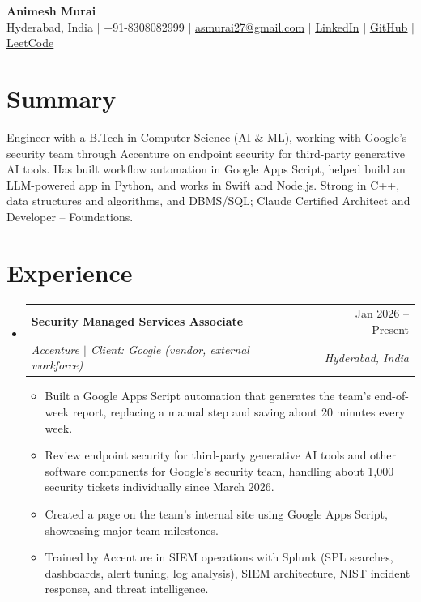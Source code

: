 \documentclass[a4paper,11pt]{article}
\makeatletter
\newcommand{\resumeItem}[1]{\item\small{#1\vspace{-1pt}}}
\newcommand{\resumeSubheading}[4]{
  \vspace{-1pt}\item
    \begin{tabularx}{0.97\textwidth}[t]{@{}>{\raggedright\arraybackslash}X@{\hspace{0.75em}}r@{}}
      \textbf{#1} & #2 \\
      \textit{\small#3} & \textit{\small #4} \\
    \end{tabularx}\vspace{-3pt}
}
\newcommand{\resumeSubItemListStart}{\begin{itemize}[leftmargin=0.15in, label={}]}
\newcommand{\resumeSubItemListEnd}{\end{itemize}}
\newcommand{\resumeItemListStart}{\begin{itemize}[itemsep=2pt]}
\newcommand{\resumeItemListEnd}{\end{itemize}\vspace{-2pt}}
\makeatother
\begin{document}
\begin{center}
    {\Huge\bfseries Animesh Murai} \\ \vspace{4pt}
    \small Hyderabad, India $|$ +91-8308082999 $|$
    \href{mailto:asmurai27@gmail.com}{\underline{asmurai27@gmail.com}} $|$
    \href{https://www.linkedin.com/in/animesh-murai-538384253/}{\underline{LinkedIn}} $|$
    \href{https://github.com/muraias7781}{\underline{GitHub}} $|$
    \href{https://leetcode.com/u/sAMurai7781/}{\underline{LeetCode}}
\end{center}

\section{Summary}
  \small{Engineer with a B.Tech in Computer Science (AI \& ML), working with Google's security team through Accenture on endpoint security for third-party generative AI tools. Has built workflow automation in Google Apps Script, helped build an LLM-powered app in Python, and works in Swift and Node.js. Strong in C++, data structures and algorithms, and DBMS/SQL; Claude Certified Architect and Developer -- Foundations.}

\section{Experience}
  \resumeSubItemListStart

    \resumeSubheading
      {Security Managed Services Associate}{Jan 2026 -- Present}
      {Accenture $|$ Client: Google (vendor, external workforce)}{Hyderabad, India}
      \resumeItemListStart
        \resumeItem{Built a Google Apps Script automation that generates the team's end-of-week report, replacing a manual step and saving about 20 minutes every week.}
        \resumeItem{Review endpoint security for third-party generative AI tools and other software components for Google's security team, handling about 1,000 security tickets individually since March 2026.}
        \resumeItem{Created a page on the team's internal site using Google Apps Script, showcasing major team milestones.}
        \resumeItem{Trained by Accenture in SIEM operations with Splunk (SPL searches, dashboards, alert tuning, log analysis), SIEM architecture, NIST incident response, and threat intelligence.}
      \resumeItemListEnd

  \resumeSubItemListEnd
\end{document}
